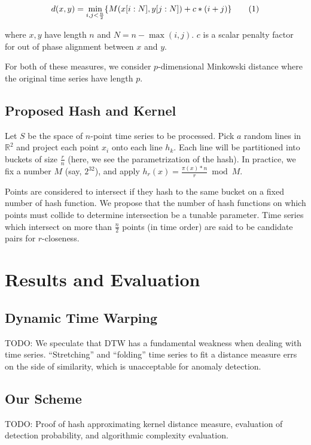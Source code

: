 \documentclass[a4paper]{article}
\makeatletter
\newcommand\numberthis{\addtocounter{equation}{1}\tag{\theequation}}
\theoremstyle{def}
\theoremstyle{thm}
\newcommand{\R}[0]{\mathbb{R}}
\newcommand{\todo}[1]{}
\renewcommand{\todo}[1]{{\color{red} TODO\@: {#1}}}
\makeatother
\begin{document}
\begin{align*}
    d(x,y) = \min\limits_{i,j<\frac{n}{2}} \{ M(x[i:N],y[j:N]) + c*(i+j) \} \numberthis \\
\end{align*}

where $x,y$ have length $n$ and $N = n - \max(i,j)$.
$c$ is a scalar penalty factor for out of phase alignment between $x$ and $y$.

For both of these measures, we consider $p$-dimensional Minkowski distance where the original time series have length $p$.

\fi

\subsection{Proposed Hash and Kernel}
\label{subsec:proposed_kernel}

Let $S$ be the space of $n$-point time series to be processed.
Pick $a$ random lines in $\R^2$ and project each point $x_i$ onto each line $h_k$.
Each line will be partitioned into buckets of size $\frac{r}{n}$ (here, we see the parametrization of the hash).
In practice, we fix a number $M$ (say, $2^{32}$), and apply $h_r(x) = \frac{\pi(x)*n}{r} \bmod M$. 

Points are considered to intersect if they hash to the same bucket on a fixed number of hash function.
We propose that the number of hash functions on which points must collide to determine intersection be a tunable parameter.
Time series which intersect on more than $\frac{n}{2}$ points (in time order) are said to be candidate pairs for $r$-closeness.

\section{Results and Evaluation}

\subsection{Dynamic Time Warping}

\todo{We speculate that DTW has a fundamental weakness when dealing with time series.
    ``Stretching'' and ``folding'' time series to fit a distance measure errs on the side of similarity, which is unacceptable for anomaly detection.}

\subsection{Our Scheme}

\todo{Proof of hash approximating kernel distance measure, evaluation of detection probability, and algorithmic complexity evaluation.}



\end{document}

